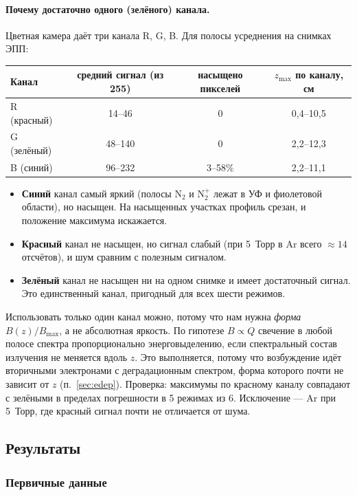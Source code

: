 \documentclass[12pt,a4paper]{article}
\newcommand{\Nt}{\mathrm{N_2}}
\begin{document}
\paragraph{Почему достаточно одного (зелёного) канала.}
Цветная камера даёт три канала R, G, B. Для полосы усреднения на
снимках ЭПП:
\begin{center}
  \begin{tabular}{lccc}
    \toprule
    Канал & средний сигнал (из 255) & насыщено пикселей & $z_\text{max}$ по каналу, см \\
    \midrule
    R (красный) & 14--46  & 0       & 0,4--10,5 \\
    G (зелёный) & 48--140 & 0       & 2,2--12,3 \\
    B (синий)   & 96--232 & 3--58\% & 2,2--11,1 \\
    \bottomrule
  \end{tabular}
\end{center}
\begin{itemize}
  \item \textbf{Синий} канал самый яркий (полосы $\Nt$ и $\mathrm{N}_2^+$
        лежат в УФ и фиолетовой области), но насыщен. На насыщенных
        участках профиль срезан, и положение максимума искажается.
  \item \textbf{Красный} канал не насыщен, но сигнал слабый (при 5~Торр
        в Ar всего $\approx 14$ отсчётов), и шум сравним с полезным
        сигналом.
  \item \textbf{Зелёный} канал не насыщен ни на одном снимке и имеет
        достаточный сигнал. Это единственный канал, пригодный для всех
        шести режимов.
\end{itemize}
Использовать только один канал можно, потому что нам нужна
\emph{форма} $B(z)/B_\text{max}$, а не абсолютная яркость. По гипотезе
$B\propto Q$ свечение в любой полосе спектра пропорционально
энерговыделению, если спектральный состав излучения не меняется вдоль
$z$. Это выполняется, потому что возбуждение идёт вторичными электронами
с деградационным спектром, форма которого почти не зависит от $z$
(п.~\ref{sec:edep}). Проверка: максимумы по красному каналу совпадают с
зелёными в пределах погрешности в 5 режимах из 6. Исключение --- Ar при
5~Торр, где красный сигнал почти не отличается от шума.

\subsection{Результаты}

\subsubsection{Первичные данные}
\end{document}
